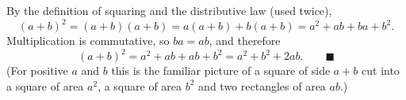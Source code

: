 By the definition of squaring and the distributive law (used twice),
\[
(a+b)^2=(a+b)(a+b)=a(a+b)+b(a+b)=a^2+ab+ba+b^2 .
\]
Multiplication is commutative, so $ba=ab$, and therefore
\[
(a+b)^2=a^2+ab+ab+b^2=a^2+b^2+2ab. \qquad\blacksquare
\]
(For positive $a$ and $b$ this is the familiar picture of a square of side $a+b$ cut into a square of area $a^2$, a square of area $b^2$ and two rectangles of area $ab$.)
